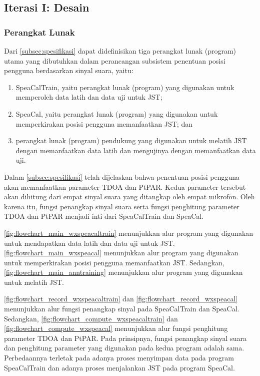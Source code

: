 \subsection{Iterasi I: Desain}
\label{subsec:iter1_desain}

\subsubsection{Perangkat Lunak}

Dari \autoref{subsec:spesifikasi} dapat didefinisikan tiga perangkat lunak (program) utama yang dibutuhkan dalam perancangan subsistem penentuan posisi pengguna berdasarkan sinyal suara, yaitu:
\begin{enumerate}
\item SpeaCalTrain, yaitu perangkat lunak (program) yang digunakan untuk memperoleh data latih dan data uji untuk JST;
\item SpeaCal, yaitu perangkat lunak (program) yang digunakan untuk memperkirakan posisi pengguna memanfaatkan JST; dan
\item perangkat lunak (program) pendukung yang digunakan untuk melatih JST dengan memanfaatkan data latih dan mengujinya dengan memanfaatkan data uji.
\end{enumerate}

Dalam \autoref{subsec:spesifikasi} telah dijelaskan bahwa penentuan posisi pengguna akan memanfaatkan parameter TDOA dan PtPAR. Kedua parameter tersebut akan dihitung dari empat sinyal suara yang ditangkap oleh empat mikrofon. Oleh karena itu, fungsi penangkap sinyal suara serta fungsi penghitung parameter TDOA dan PtPAR menjadi inti dari SpeaCalTrain dan SpeaCal. 

\autoref{fig:flowchart_main_wxspeacaltrain} menunjukkan alur program yang digunakan untuk mendapatkan data latih dan data uji untuk JST. \autoref{fig:flowchart_main_wxspeacal} menunjukkan alur program yang digunakan untuk memperkirakan posisi pengguna memanfaatkan JST. Sedangkan, \autoref{fig:flowchart_main_anntraining} menunjukkan alur program yang digunakan untuk melatih JST.

\autoref{fig:flowchart_record_wxspeacaltrain} dan \autoref{fig:flowchart_record_wxspeacal} menunjukkan alur fungsi penangkap sinyal pada SpeaCalTrain dan SpeaCal. Sedangkan, \autoref{fig:flowchart_compute_wxspeacaltrain} dan \autoref{fig:flowchart_compute_wxspeacal} menunjukkan alur fungsi penghitung parameter TDOA dan PtPAR. Pada prinsipnya, fungsi penangkap sinyal suara dan penghitung parameter yang digunakan pada kedua program adalah sama. Perbedaannya terletak pada adanya proses menyimpan data pada program SpeaCalTrain dan adanya proses menjalankan JST pada program SpeaCal.

